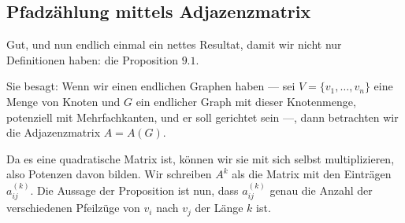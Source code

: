 \subsection{Pfadzählung mittels Adjazenzmatrix}

\begin{spoken-clean}[01:14:24 - 01:17:18]
Gut, und nun endlich einmal ein nettes Resultat, damit wir nicht nur Definitionen haben: die Proposition $9.1$.

Sie besagt: Wenn wir einen endlichen Graphen haben --- sei $V = \{v_1, \dots, v_n\}$ eine Menge von Knoten und $G$ ein endlicher Graph mit dieser Knotenmenge, potenziell mit Mehrfachkanten, und er soll gerichtet sein ---, dann betrachten wir die Adjazenzmatrix $A = A(G)$.

Da es eine quadratische Matrix ist, können wir sie mit sich selbst multiplizieren, also Potenzen davon bilden. Wir schreiben $A^k$ als die Matrix mit den Einträgen $a_{ij}^{(k)}$. Die Aussage der Proposition ist nun, dass $a_{ij}^{(k)}$ genau die Anzahl der verschiedenen Pfeilzüge von $v_i$ nach $v_j$ der Länge $k$ ist.
\end{spoken-clean}

\begin{math-stroke}
\end{math-stroke}

